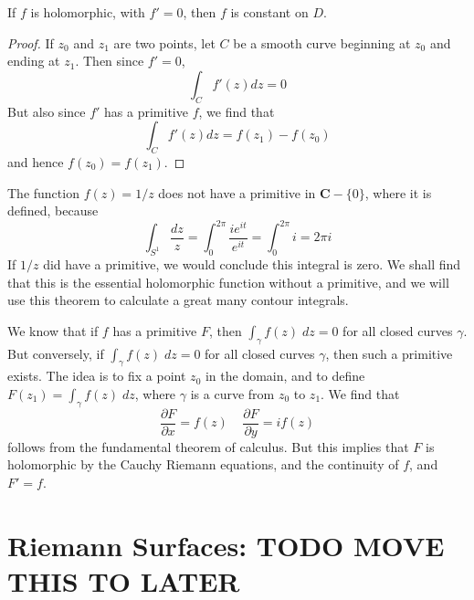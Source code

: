 \begin{corollary}
    If $f$ is holomorphic, with $f' = 0$, then $f$ is constant on $D$.
\end{corollary}
\begin{proof}
    If $z_0$ and $z_1$ are two points, let $C$ be a smooth curve beginning at $z_0$ and ending at $z_1$. Then since $f' = 0$,
    \[ \int_C f'(z) dz = 0  \]
    But also since $f'$ has a primitive $f$, we find that
    \[ \int_C f'(z) dz = f(z_1) - f(z_0) \]
    and hence $f(z_0) = f(z_1)$.
\end{proof}

\begin{example}
    The function $f(z) = 1/z$ does not have a primitive in $\mathbf{C} - \{ 0 \}$, where it is defined, because
    \[ \int_{S^1} \frac{dz}{z} = \int_0^{2\pi} \frac{ie^{it}}{e^{it}} = \int_0^{2\pi} i = 2 \pi i \]
    If $1/z$ did have a primitive, we would conclude this integral is zero. We shall find that this is the essential holomorphic function without a primitive, and we will use this theorem to calculate a great many contour integrals.
\end{example}

We know that if $f$ has a primitive $F$, then $\int_\gamma f(z)\; dz = 0$ for all closed curves $\gamma$. But conversely, if $\int_\gamma f(z)\; dz = 0$ for all closed curves $\gamma$, then such a primitive exists. The idea is to fix a point $z_0$ in the domain, and to define $F(z_1) = \int_\gamma f(z)\; dz$, where $\gamma$ is a curve from $z_0$ to $z_1$. We find that
%
\[ \frac{\partial F}{\partial x} = f(z)\ \ \ \ \ \frac{\partial F}{\partial y} = i f(z) \]
%
follows from the fundamental theorem of calculus. But this implies that $F$ is holomorphic by the Cauchy Riemann equations, and the continuity of $f$, and $F' = f$.














\section{Riemann Surfaces: TODO MOVE THIS TO LATER}

